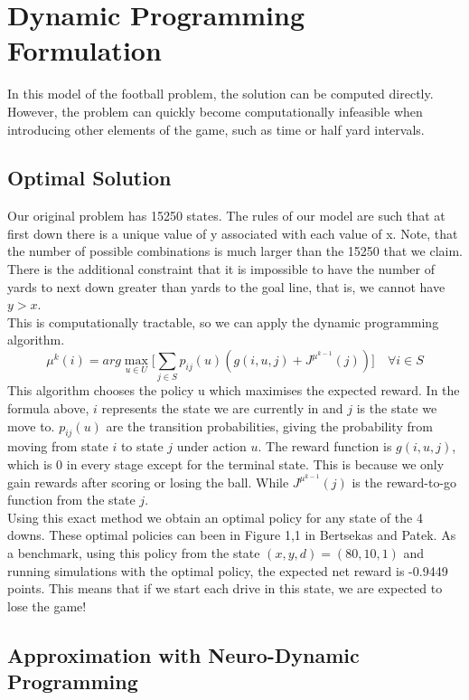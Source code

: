\documentclass[11pt, oneside]{article}   	%
\begin{document}
\newpage
\section{Dynamic Programming Formulation}
In this model of the football problem, the solution can be computed directly. However, the problem can quickly become computationally infeasible when introducing other elements of the game, such as time or half yard intervals. 
\subsection{Optimal Solution}
Our original problem has 15250 states. The rules of our model are such that at first down there is a unique value of y associated with each value of x. Note, that the number of possible combinations is much larger than the 15250 that we claim. There is the additional constraint that it is impossible to have the number of yards to next down greater than yards to the goal line, that is, we cannot have $y>x$. \\

This is computationally tractable, so we can apply the dynamic programming algorithm. 
$$
\mu^{k}(i) = arg\max\limits_{u \in U} \Big[ \sum\limits_{j \in S} p_{ij}(u)(g(i,u,j) +  J^{\mu^{k-1}}(j))\Big] \quad \forall i \in S
$$
This algorithm chooses the policy u  which maximises the expected reward. In the formula above, $i$ represents the state we are currently in and $j$ is the state we move to. $p_{ij}(u)$ are the transition probabilities, giving the probability from moving from state $i$ to state $j$ under action $u$. The reward function is $g(i,u,j)$, which is 0 in every stage except for the terminal state. This is because we only gain rewards after scoring or losing the ball. While $J^{\mu^{k-1}}(j)$ is the reward-to-go  function from the state $j$. \\

Using this exact method we obtain an optimal policy for any state of the 4 downs. These optimal policies can been in Figure 1,1 in Bertsekas and Patek. As a benchmark, using this policy from the state $(x,y,d)=(80,10,1)$ and running simulations with the optimal policy, the expected net reward is -0.9449 points. This means that if we start each drive in this state, we are expected to lose the game!

\subsection{Approximation with Neuro-Dynamic Programming}
\end{document}
